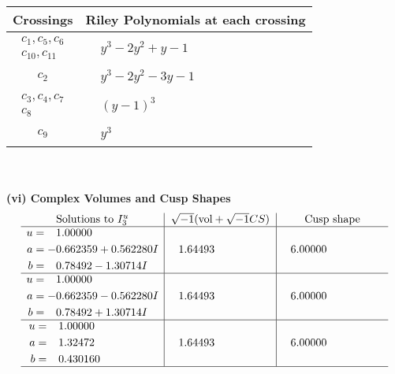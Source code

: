 \documentclass[1p]{elsarticle_modified}
\theoremstyle{definition}
\newcommand{\I}{\sqrt{-1}}
\begin{document}
\begin{tabular}{m{50pt}|m{274pt}}
Crossings & \hspace{64pt}Riley Polynomials at each crossing \\
\hline $$\begin{aligned}c_{1},c_{5},c_{6}\\c_{10},c_{11}\end{aligned}$$&$\begin{aligned}
&y^3-2 y^2+y-1
\end{aligned}$\\
\hline $$\begin{aligned}c_{2}\end{aligned}$$&$\begin{aligned}
&y^3-2 y^2-3 y-1
\end{aligned}$\\
\hline $$\begin{aligned}c_{3},c_{4},c_{7}\\c_{8}\end{aligned}$$&$\begin{aligned}
&(y-1)^3
\end{aligned}$\\
\hline $$\begin{aligned}c_{9}\end{aligned}$$&$\begin{aligned}
&y^3
\end{aligned}$\\
\hline
\end{tabular}\\~\\
\newpage\flushleft \textbf{(vi) Complex Volumes and Cusp Shapes}
$$\begin{array}{c|c|c}  
\text{Solutions to }I^u_{3}& \I (\text{vol} + \sqrt{-1}CS) & \text{Cusp shape}\\
 \hline 
\begin{aligned}
u &= \phantom{-}1.00000\phantom{ +0.000000I} \\
a &= -0.662359 + 0.562280 I \\
b &= \phantom{-}0.78492 - 1.30714 I\end{aligned}
 & \phantom{-}1.64493\phantom{ +0.000000I} & \phantom{-}6.00000\phantom{ +0.000000I} \\ \hline\begin{aligned}
u &= \phantom{-}1.00000\phantom{ +0.000000I} \\
a &= -0.662359 - 0.562280 I \\
b &= \phantom{-}0.78492 + 1.30714 I\end{aligned}
 & \phantom{-}1.64493\phantom{ +0.000000I} & \phantom{-}6.00000\phantom{ +0.000000I} \\ \hline\begin{aligned}
u &= \phantom{-}1.00000\phantom{ +0.000000I} \\
a &= \phantom{-}1.32472\phantom{ +0.000000I} \\
b &= \phantom{-}0.430160\phantom{ +0.000000I}\end{aligned}
 & \phantom{-}1.64493\phantom{ +0.000000I} & \phantom{-}6.00000\phantom{ +0.000000I}\\
 \hline 
 \end{array}$$\newpage\newpage\renewcommand{\arraystretch}{1}
\end{document}
